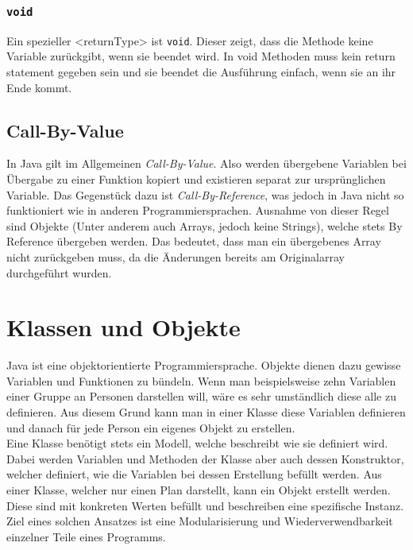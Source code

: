 \documentclass{article}
\begin{document}
	\subsubsection{\texorpdfstring{\texttt{void}}{void}}
	Ein spezieller <returnType> ist \verb|void|. Dieser zeigt, dass die Methode keine Variable zurückgibt, wenn sie beendet wird. In void Methoden muss kein return statement gegeben sein und sie beendet die Ausführung einfach, wenn sie an ihr Ende kommt. 
	\subsection{Call-By-Value}
	In Java gilt im Allgemeinen \textit{Call-By-Value}. Also werden übergebene Variablen bei Übergabe zu einer Funktion kopiert und existieren separat zur ursprünglichen Variable. Das Gegenstück dazu ist \textit{Call-By-Reference}, was jedoch in Java nicht so funktioniert wie in anderen Programmiersprachen. Ausnahme von dieser Regel sind Objekte (Unter anderem auch Arrays, jedoch keine Strings), welche stets By Reference übergeben werden. Das bedeutet, dass man ein übergebenes Array nicht zurückgeben muss, da die Änderungen bereits am Originalarray durchgeführt wurden.
	\section{Klassen und Objekte}
	Java ist eine objektorientierte Programmiersprache. Objekte dienen dazu gewisse Variablen und Funktionen zu bündeln. Wenn man beispielsweise zehn Variablen einer Gruppe an Personen darstellen will, wäre es sehr umständlich diese alle zu definieren. Aus diesem Grund kann man in einer Klasse diese Variablen definieren und danach für jede Person ein eigenes Objekt zu erstellen. \\
	Eine Klasse benötigt stets ein Modell, welche beschreibt wie sie definiert wird. Dabei werden Variablen und Methoden der Klasse aber auch dessen Konstruktor, welcher definiert, wie die Variablen bei dessen Erstellung befüllt werden. Aus einer Klasse, welcher nur einen Plan darstellt, kann ein Objekt erstellt werden. Diese sind mit konkreten Werten befüllt und beschreiben eine spezifische Instanz. \\
	Ziel eines solchen Ansatzes ist eine Modularisierung und Wiederverwendbarkeit einzelner Teile eines Programms.
\end{document}
